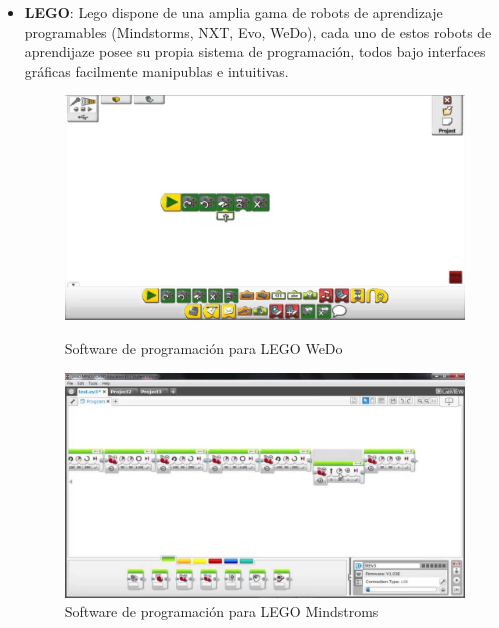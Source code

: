 \begin{itemize}
\item \textbf{LEGO}: Lego dispone de una amplia gama de robots de aprendizaje programables (Mindstorms, NXT, Evo, WeDo), cada uno de estos robots de aprendijaze posee su propia sistema de programación, todos bajo interfaces gráficas facilmente manipublas e intuitivas.\\
\begin{figure}[H]
	\begin{minipage}{0.48\textwidth}
    	\centering
     	\includegraphics[scale=0.15]{img/lego-wedo.jpg}
  		\caption{Software de programación para LEGO WeDo}
  		\label{fig:lego-wedo}
   	\end{minipage}\hfill
   	\begin {minipage}{0.48\textwidth}
     	\centering
     	\includegraphics[scale=0.15]{img/lego-mindstorms.jpg}
     	\caption{Software de programación para LEGO Mindstroms}
     	\label{fig:lego-mindstorms}
	\end{minipage}
\end{figure}


\end{itemize}
